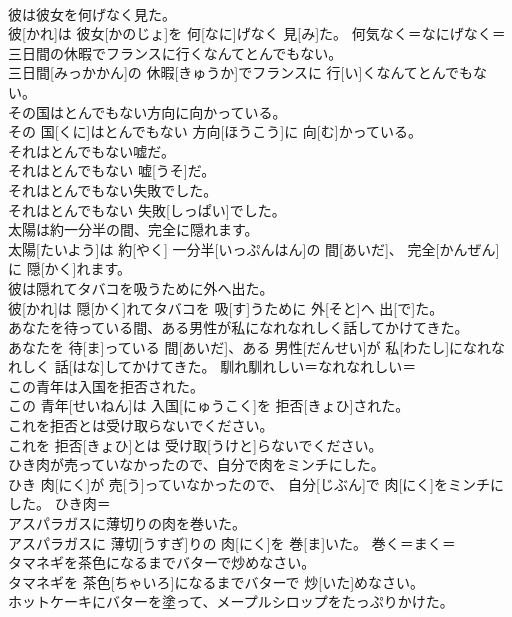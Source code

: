 \documentclass[8pt]{extreport}
\begin{document}
\begin{CJK}{UTF8}{min}
\\	彼は彼女を何げなく見た。	
\\	彼[かれ]は 彼女[かのじょ]を 何[なに]げなく 見[み]た。	何気なく＝なにげなく＝ 
\\	三日間の休暇でフランスに行くなんてとんでもない。	
\\	三日間[みっかかん]の 休暇[きゅうか]でフランスに 行[い]くなんてとんでもない。	
\\	その国はとんでもない方向に向かっている。	
\\	その 国[くに]はとんでもない 方向[ほうこう]に 向[む]かっている。	
\\	それはとんでもない嘘だ。	
\\	それはとんでもない 嘘[うそ]だ。	
\\	それはとんでもない失敗でした。	
\\	それはとんでもない 失敗[しっぱい]でした。	
\\	太陽は約一分半の間、完全に隠れます。	
\\	太陽[たいよう]は 約[やく] 一分半[いっぷんはん]の 間[あいだ]、 完全[かんぜん]に 隠[かく]れます。	
\\	彼は隠れてタバコを吸うために外へ出た。	
\\	彼[かれ]は 隠[かく]れてタバコを 吸[す]うために 外[そと]へ 出[で]た。	
\\	あなたを待っている間、ある男性が私になれなれしく話してかけてきた。	
\\	あなたを 待[ま]っている 間[あいだ]、ある 男性[だんせい]が 私[わたし]になれなれしく 話[はな]してかけてきた。	馴れ馴れしい＝なれなれしい＝ 
\\	この青年は入国を拒否された。	
\\	この 青年[せいねん]は 入国[にゅうこく]を 拒否[きょひ]された。	
\\	これを拒否とは受け取らないでください。	
\\	これを 拒否[きょひ]とは 受け取[うけと]らないでください。	
\\	ひき肉が売っていなかったので、自分で肉をミンチにした。	
\\	ひき 肉[にく]が 売[う]っていなかったので、 自分[じぶん]で 肉[にく]をミンチにした。	ひき肉＝ 
\\	アスパラガスに薄切りの肉を巻いた。	
\\	アスパラガスに 薄切[うすぎ]りの 肉[にく]を 巻[ま]いた。	巻く＝まく＝ 
\\	タマネギを茶色になるまでバターで炒めなさい。	
\\	タマネギを 茶色[ちゃいろ]になるまでバターで 炒[いた]めなさい。	
\\	ホットケーキにバターを塗って、メープルシロップをたっぷりかけた。	

\end{CJK}
\end{document}
